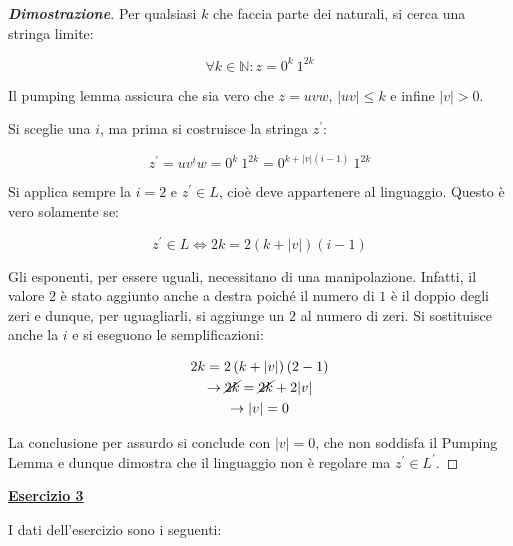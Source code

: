 \documentclass[a4paper]{article}
\begin{document}
	\begin{proof}[\textcolor{Blue3}{\textbf{Dimostrazione}}]
		Per qualsiasi $k$ che faccia parte dei naturali, si cerca una stringa limite:
		
		\begin{equation*}
			\forall k \in \mathbb{N} : z = 0^{k} \: 1^{2k}
		\end{equation*}
	
		\noindent
		Il pumping lemma assicura che sia vero che $z = uvw$, $|uv| \le k$ e infine $|v| > 0$.\newline
		
		\noindent
		Si sceglie una $i$, ma prima si costruisce la stringa $z^{'}$:
		
		\begin{equation*}
			z^{'} = u v^{i} w = 0^{k} \: 1^{2k} = 0^{k + |v|\left(i-1\right)} \: 1^{2k}
		\end{equation*}
	
		\noindent
		Si applica sempre la $i = 2$ e $z^{'} \in L$, cioè deve appartenere al linguaggio. Questo è vero solamente se:
		
		\begin{equation*}
			z^{'} \in L \iff 2k = 2 \left(k+|v|\right)\left(i-1\right)
		\end{equation*}
		
		\noindent
		Gli esponenti, per essere uguali, necessitano di una manipolazione. Infatti, il valore $2$ è stato aggiunto anche a destra poiché il numero di $1$ è il doppio degli zeri e dunque, per uguagliarli, si aggiunge un $2$ al numero di zeri. Si sostituisce anche la $i$ e si eseguono le semplificazioni:
		
		\begin{gather*}
			2k = 2 \left(k+|v|\right)\left(2-1\right) \\
			\rightarrow \cancel{2k} = \cancel{2k} + 2 |v| \\
			\rightarrow |v| = 0
		\end{gather*}
	
		\noindent
		La conclusione per assurdo si conclude con $|v| = 0$, che non soddisfa il Pumping Lemma e dunque dimostra che il linguaggio non è regolare ma $z^{'} \in L^{'}$.
	\end{proof}

	\newpage
	
	\noindent
	\textcolor{Red3}{\textbf{\underline{Esercizio 3}}}\newline
	
	\noindent
	I dati dell'esercizio sono i seguenti:
	
\end{document}
